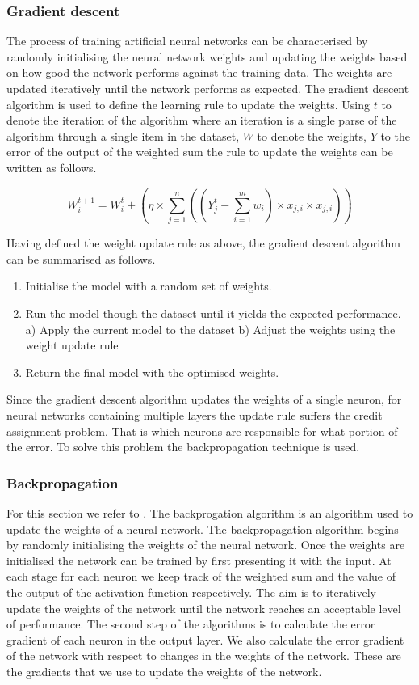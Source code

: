 \documentclass[a4paper,11pt]{article}
\begin{document}
\subsubsection{Gradient descent}
The process of training  artificial neural networks can be characterised by randomly initialising the neural network weights and updating the weights based on how good the network performs against the training data. The weights are updated iteratively until the network performs as expected. The gradient descent algorithm is used to define the learning rule to update the weights. Using $t$ to denote the iteration of the algorithm where an iteration is a single parse of the algorithm through a single item in the dataset, $W$ to denote the weights, $Y$ to the error of the output of the weighted sum the rule to update the weights can be written as follows.

 \[ W_i^{t+1}= W_i^{t} + \left( \eta  \times \sum_{j=1}^{n} \left( \left(Y_j^t -  \sum_{i=1}^{m}w_i \right)\times x_{j,i}  \times x_{j,i}\right) \right) \]

Having defined the weight update rule as above, the gradient descent algorithm can be summarised as follows.

\begin{enumerate}
\item Initialise the model with a random set of weights.
\item Run the model though the dataset until it yields the expected performance.
\subitem a) Apply the current model to the dataset
\subitem b) Adjust the weights using the weight update rule
\item Return the final model with the optimised weights.
\end{enumerate}

Since the gradient descent algorithm updates the weights of a single neuron, for neural networks containing multiple layers the update rule suffers the credit assignment problem. That is which neurons are responsible for what portion of the error. To solve this problem the backpropagation technique is used.

\subsubsection{Backpropagation}
\label{backprop}
For this section we refer to \cite{John}. The backprogation algorithm is an algorithm used to update the weights of a neural network. The backpropagation algorithm begins by randomly initialising the weights of the   neural network. Once the weights are initialised the network can be trained by first presenting it with the input. At each stage for each neuron we keep track of the weighted sum and the value of the output of the activation function respectively. The aim is to iteratively update the weights of the network until the network reaches an acceptable level of performance. The second step of the algorithms is to calculate the error gradient of each neuron in the output layer.  We also calculate the error gradient of the network with respect to changes in the weights of the network. These are the gradients that  we use to update the weights of the network.
\end{document}
